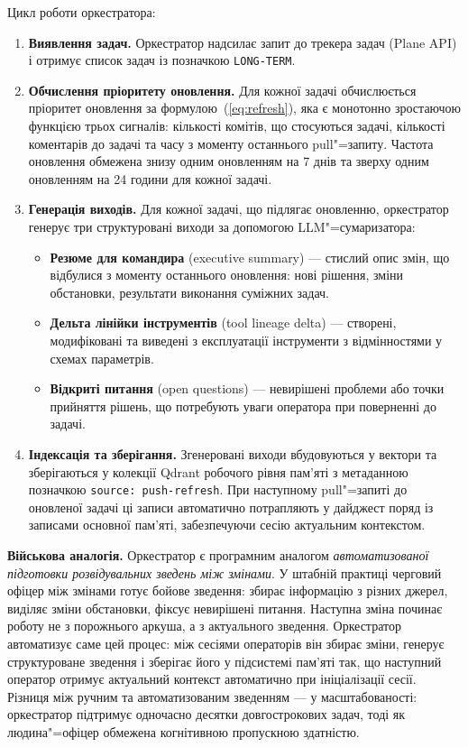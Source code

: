 Цикл роботи оркестратора:
\begin{enumerate}[nosep]
  \item \textbf{Виявлення задач.} Оркестратор надсилає запит до трекера задач (Plane API) і отримує список задач із позначкою \texttt{LONG-TERM}.
  \item \textbf{Обчислення пріоритету оновлення.} Для кожної задачі обчислюється пріоритет оновлення за формулою~(\ref{eq:refresh}), яка є монотонно зростаючою функцією трьох сигналів: кількості комітів, що стосуються задачі, кількості коментарів до задачі та часу з моменту останнього pull"=запиту.
  Частота оновлення обмежена знизу одним оновленням на 7 днів та зверху одним оновленням на 24 години для кожної задачі.
  \item \textbf{Генерація виходів.} Для кожної задачі, що підлягає оновленню, оркестратор генерує три структуровані виходи за допомогою LLM"=сумаризатора:
  \begin{itemize}[nosep]
    \item \textbf{Резюме для командира} (executive summary) --- стислий опис змін, що відбулися з моменту останнього оновлення: нові рішення, зміни обстановки, результати виконання суміжних задач.
    \item \textbf{Дельта лінійки інструментів} (tool lineage delta) --- створені, модифіковані та виведені з експлуатації інструменти з відмінностями у схемах параметрів.
    \item \textbf{Відкриті питання} (open questions) --- невирішені проблеми або точки прийняття рішень, що потребують уваги оператора при поверненні до задачі.
  \end{itemize}
  \item \textbf{Індексація та зберігання.} Згенеровані виходи вбудовуються у вектори та зберігаються у колекції Qdrant робочого рівня пам'яті з метаданною позначкою \texttt{source:\,push-refresh}.
  При наступному pull"=запиті до оновленої задачі ці записи автоматично потрапляють у дайджест поряд із записами основної пам'яті, забезпечуючи сесію актуальним контекстом.
\end{enumerate}

\textbf{Військова аналогія.}
Оркестратор є програмним аналогом \emph{автоматизованої підготовки розвідувальних зведень між змінами}.
У штабній практиці черговий офіцер між змінами готує бойове зведення: збирає інформацію з різних джерел, виділяє зміни обстановки, фіксує невирішені питання.
Наступна зміна починає роботу не з порожнього аркуша, а з актуального зведення.
Оркестратор автоматизує саме цей процес: між сесіями операторів він збирає зміни, генерує структуроване зведення і зберігає його у підсистемі пам'яті так, що наступний оператор отримує актуальний контекст автоматично при ініціалізації сесії.
Різниця між ручним та автоматизованим зведенням --- у масштабованості: оркестратор підтримує одночасно десятки довгострокових задач, тоді як людина"=офіцер обмежена когнітивною пропускною здатністю.
